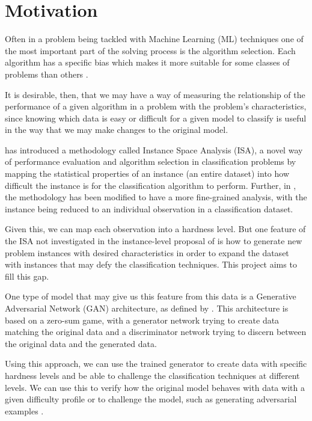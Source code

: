 \section{Motivation}
Often in a problem being tackled with Machine Learning (ML) techniques one of the most important part of the solving process is the algorithm selection. Each algorithm has a specific bias which makes it more suitable for some classes of problems than others \cite{Adam2019}. 

It is desirable, then, that we may have a way of measuring the relationship of the performance of a given algorithm in a problem with the problem's characteristics, since knowing which data is easy or difficult for a given model to classify is useful in the way that we may make changes to the original model.

 has introduced a methodology called Instance Space Analysis (ISA), a novel way of performance evaluation and algorithm selection in classification problems by mapping the statistical properties of an instance (an entire dataset) into how difficult the instance is for the classification algorithm to perform. Further, in , the methodology has been modified to have a more fine-grained analysis, with the instance being reduced to an individual observation in a classification dataset.

Given this, we can map each observation into a hardness level. But one feature of the ISA not investigated in the instance-level proposal of  is how to generate new problem instances with desired characteristics in order to expand the dataset with instances that may defy the classification techniques. This project aims to fill this gap. 

One type of model that may give us this feature from this data is a Generative Adversarial Network (GAN) architecture, as defined by . This architecture is based on a zero-sum game, with a generator network trying to create data matching the original data and a discriminator network trying to discern between the original data and the generated data. 

Using this approach, we can use the trained generator to create data with specific hardness levels and be able to challenge the classification techniques at different levels. We can use this to verify how the original model behaves with data with a given difficulty profile or to challenge the model, such as generating adversarial examples \cite{Yuan2019}.

